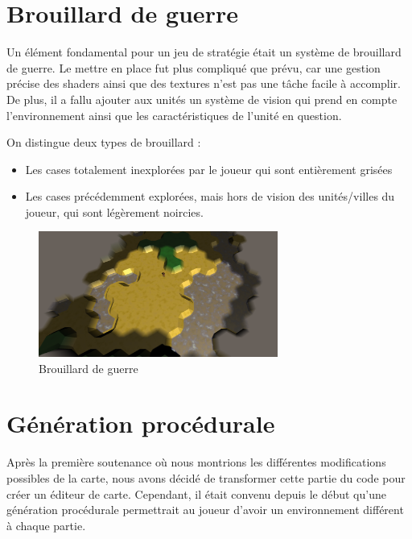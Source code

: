 \documentclass[12pt]{report}
\begin{document}
\section{Brouillard de guerre}

Un élément fondamental pour un jeu de stratégie était un système de brouillard
de guerre. Le mettre en place fut plus compliqué que prévu, car une gestion
précise des shaders ainsi que des textures n’est pas une tâche facile à
accomplir. De plus, il a fallu ajouter aux unités un système de vision qui prend
en compte l’environnement ainsi que les caractéristiques de l’unité en question.

\newpage

On distingue deux types de brouillard :

\begin{itemize}
    \item Les cases totalement inexplorées par le joueur qui sont entièrement
        grisées
    \item Les cases précédemment explorées, mais hors de vision des
        unités/villes du joueur, qui sont légèrement noircies.
\end{itemize}

\begin{figure}[H]
    \centering
    \includegraphics[width=0.7\textwidth]{../report_2/img/FogOfWar}
    \caption*{Brouillard de guerre}
\end{figure}

\section{Génération procédurale}

Après la première soutenance où nous montrions les différentes modifications
possibles de la carte, nous avons décidé de transformer cette partie du code
pour créer un éditeur de carte. Cependant, il était convenu depuis le début
qu’une génération procédurale permettrait au joueur d’avoir un environnement
différent à chaque partie.
\end{document}

